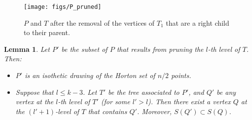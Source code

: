 \documentclass{article}
\newtheorem{lemma}[theorem]{Lemma}
\begin{document}
\begin{figure}
\begin{center}
\texttt{[image: figs/P\_pruned]}
\end{center}
\caption{$P$ and $T$ after the removal of the vertices of $T_1$ that 
are a right child to their parent.}
\label{fig:T_pruned}
\end{figure}


\begin{lemma}\label{lem:prune}
Let $P'$ be the subset of $P$ that results from pruning the $l$-th level of $T$.
Then:

\begin{itemize}
 \item[(1)]$P'$ is an isothetic drawing of the Horton set of $n/2$ points.
 
 \item[(2)] Suppose that $l \le k-3$.  Let $T'$ be the tree associated to $P'$, and $Q'$ be any vertex at the $l$-th level of $T'$ (for
 some $l'>l$).
 Then there exist a vertex
  $Q$  at the $(l'+1)$-level of $T$ that contains $Q'$. Moreover, $S(Q')\subset S(Q)$.
\end{itemize}
\end{lemma}
\end{document}
